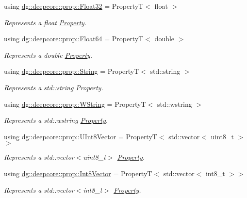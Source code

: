 \begin{DoxyCompactItemize}
using \hyperlink{group___process_properties_ga510dd39bb8449946d6317469973644c9}{dg\+::deepcore\+::prop\+::\+Float32} = PropertyT$<$ float $>$
\begin{DoxyCompactList}\small\item\em Represents a {\ttfamily float} \hyperlink{classdg_1_1deepcore_1_1_property}{Property}. \end{DoxyCompactList}\item 
using \hyperlink{group___process_properties_ga9c03a5a68945303265f5ab945f2bfa2a}{dg\+::deepcore\+::prop\+::\+Float64} = PropertyT$<$ double $>$
\begin{DoxyCompactList}\small\item\em Represents a {\ttfamily double} \hyperlink{classdg_1_1deepcore_1_1_property}{Property}. \end{DoxyCompactList}\item 
using \hyperlink{group___process_properties_ga4e7e285652391b247ecc3a1487d234e6}{dg\+::deepcore\+::prop\+::\+String} = PropertyT$<$ std\+::string $>$
\begin{DoxyCompactList}\small\item\em Represents a {\ttfamily std\+::string} \hyperlink{classdg_1_1deepcore_1_1_property}{Property}. \end{DoxyCompactList}\item 
using \hyperlink{group___process_properties_gaf9c2048c12577553d955c02ce1247d2b}{dg\+::deepcore\+::prop\+::\+W\+String} = PropertyT$<$ std\+::wstring $>$
\begin{DoxyCompactList}\small\item\em Represents a {\ttfamily std\+::wstring} \hyperlink{classdg_1_1deepcore_1_1_property}{Property}. \end{DoxyCompactList}\item 
using \hyperlink{group___process_properties_ga07c09eb3d6ee78c35a8e4d9e846adbb6}{dg\+::deepcore\+::prop\+::\+U\+Int8\+Vector} = PropertyT$<$ std\+::vector$<$ uint8\+\_\+t $>$$>$
\begin{DoxyCompactList}\small\item\em Represents a {\ttfamily std\+::vector$<$uint8\+\_\+t$>$} \hyperlink{classdg_1_1deepcore_1_1_property}{Property}. \end{DoxyCompactList}\item 
using \hyperlink{group___process_properties_ga4992e9dee24d17c26fa3e61ed758cdfd}{dg\+::deepcore\+::prop\+::\+Int8\+Vector} = PropertyT$<$ std\+::vector$<$ int8\+\_\+t $>$$>$
\begin{DoxyCompactList}\small\item\em Represents a {\ttfamily std\+::vector$<$int8\+\_\+t$>$} \hyperlink{classdg_1_1deepcore_1_1_property}{Property}. \end{DoxyCompactList}\item 

\end{DoxyCompactItemize}
